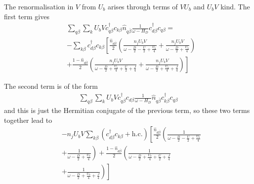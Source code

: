 \documentclass[reprint,superscriptaddress,floatfix]{revtex4-2}
\begin{document}
The renormalisation in \(V\) from \(U_b\) arises through terms of \(V U_b\) and \(U_b V\) kind. The first term gives
\begin{equation}\begin{aligned}
	&\sum_{q\beta}\sum_{k}U_b V c^\dagger_{q\beta}c_{k\beta} \hat n_{q\overline\beta} \frac{1}{\omega - H_D} c^\dagger_{d\beta}c_{q\beta} = \\
	&-\sum_{k\beta} c^\dagger_{d\beta} c_{k\beta} \left[\frac{\hat n_{d\overline\beta}}{2}\left(\frac{n_jU_b V}{\omega - \frac{D}{2} - \frac{U}{2} + \frac{U_b}{4}} + \frac{n_jU_b V}{\omega - \frac{D}{2} + \frac{U_b}{4}}\right) \right.\\
	&+ \left.\frac{1-\hat n_{d\overline\beta}}{2}\left(\frac{n_jU_b V}{\omega - \frac{D}{2} + \frac{U_b}{4} + \frac{U}{2} + \frac{J}{4}} + \frac{n_jU_b V}{\omega - \frac{D}{2} + \frac{U_b}{4} + \frac{J}{4}}\right)\right]
\end{aligned}\end{equation}

The second term is of the form
\begin{equation}\begin{aligned}
	\sum_{q\beta}\sum_{k}U_b V c^\dagger_{q\beta}c_{d\beta} \frac{1}{\omega - H_D} \hat n_{q\overline\beta} c^\dagger_{k\beta}c_{q\beta}
\end{aligned}\end{equation}
and this is just the Hermitian conjugate of the previous term, so these two terms together lead to
\begin{equation}\begin{aligned}
	&-n_jU_b V\sum_{k\beta} \left(c^\dagger_{d\beta} c_{k\beta} + \text{h.c.}\right)\left[\frac{\hat n_{d\overline\beta}}{2}\left(\frac{1}{\omega - \frac{D}{2} - \frac{U}{2} + \frac{U_b}{4}} \right.\right.\\
	&+ \left.\left. \frac{1}{\omega - \frac{D}{2} + \frac{U_b}{4}}\right) + \frac{1-\hat n_{d\overline\beta}}{2}\left(\frac{1}{\omega - \frac{D}{2} + \frac{U_b}{4} + \frac{U}{2} + \frac{J}{4}} \right.\right.\\
	&+\left.\left. \frac{1}{\omega - \frac{D}{2} + \frac{U_b}{4} + \frac{J}{4}}\right)\right]
\end{aligned}\end{equation}
\end{document}
